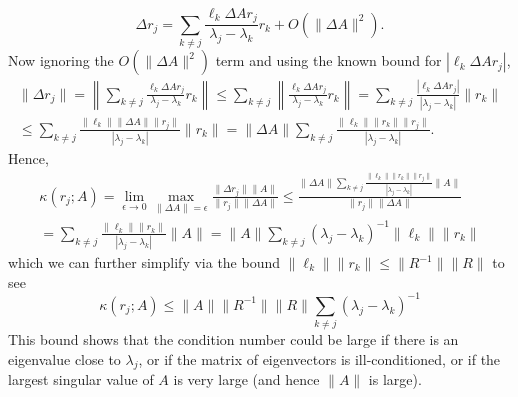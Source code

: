\documentclass{../../../kin_math}
\begin{document}
\begin{questions}
\begin{solution}
\begin{equation*}
      \Delta r_j = \sum_{k \neq j} \frac{\ell_k \Delta A r_j}{\lambda_j - \lambda_k} r_k + O(\lVert \Delta A \rVert^2).
    \end{equation*}
    Now ignoring the $O(\lVert \Delta A \rVert^2)$ term and using the known bound for $|\ell_k \Delta A r_j|$,
    \begin{multline*}
      \lVert \Delta r_j \rVert = \left\lVert \sum_{k \neq j} \frac{\ell_k \Delta A r_j}{\lambda_j - \lambda_k} r_k \right\rVert \leq \sum_{k \neq j} \left\lVert \frac{\ell_k \Delta A r_j}{\lambda_j - \lambda_k} r_k \right\rVert = \sum_{k \neq j} \frac{|\ell_k \Delta A r_j|}{|\lambda_j - \lambda_k|} \lVert r_k \rVert \\
      \leq \sum_{k \neq j} \frac{\lVert \ell_k \rVert \lVert \Delta A \rVert \lVert r_j \rVert}{|\lambda_j - \lambda_k|} \lVert r_k \rVert = \lVert \Delta A \rVert \sum_{k \neq j} \frac{\lVert \ell_k \rVert \lVert r_k \rVert \lVert r_j \rVert}{|\lambda_j - \lambda_k|}.
    \end{multline*}
    Hence,
    \begin{multline*}
      \kappa(r_j; A) = \lim_{\epsilon \to 0} \max_{\lVert \Delta A \rVert = \epsilon} \frac{\lVert \Delta r_j \rVert \lVert A \rVert}{\lVert r_j \rVert \lVert \Delta A \rVert} \leq \frac{\lVert \Delta A \rVert \sum_{k \neq j} \frac{\lVert \ell_k \rVert \lVert r_k \rVert \lVert r_j \rVert}{|\lambda_j - \lambda_k|} \lVert A \rVert}{\lVert r_j \rVert \lVert \Delta A \rVert} \\
      = \sum_{k \neq j} \frac{\lVert \ell_k \rVert \lVert r_k \rVert}{|\lambda_j - \lambda_k|} \lVert A \rVert = \lVert A \rVert \sum_{k \neq j} (\lambda_j - \lambda_k)^{-1} \lVert \ell_k \rVert \lVert r_k \rVert
    \end{multline*}
    which we can further simplify via the bound $\lVert \ell_k \rVert \lVert r_k \rVert \leq \lVert R^{-1} \rVert \lVert R \rVert$ to see
    \begin{equation*}
      \kappa(r_j; A) \leq \lVert A \rVert \lVert R^{-1} \rVert \lVert R \rVert \sum_{k \neq j} (\lambda_j - \lambda_k)^{-1}
    \end{equation*}
    This bound shows that the condition number could be large if there is an eigenvalue close to $\lambda_j$, or if the matrix of eigenvectors is ill-conditioned, or if the largest singular value of $A$ is very large (and hence $\lVert A \rVert$ is large).
  \end{solution}


\end{questions}
\end{document}
